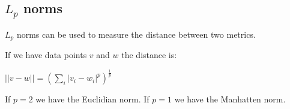 
\subsection{\(L_p\) norms}

\(L_p\) norms can be used to measure the distance between two metrics.

If we have data points \(v\) and \(w\) the distance is:

\(||v-w||=(\sum_i |v_i-w_i|^p)^{\frac{1}{p}}\)

If \(p=2\) we have the Euclidian norm. If \(p=1\) we have the Manhatten norm.

